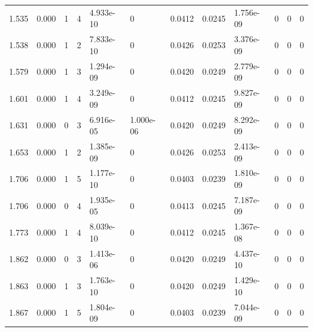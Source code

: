 \documentclass[preview]{standalone}
\begin{document}
{{\begin{tabular}{L{1.2cm}C{1.2cm} C{0.3cm}C{0.5cm} C{1.4cm}C{1.4cm} C{1.4cm}C{1.4cm} C{1.6cm}C{1.6cm} C{1.6cm}C{1.6cm}}
  1.535  &  0.000  & 1     &  4 &  4.933e-10  & 0  &  0.0412&   0.0245& 1.756e-09 & 0   &  0 & 0  \\ 
  1.538  &  0.000  & 1     &  2 &  7.833e-10  & 0  &  0.0426&   0.0253& 3.376e-09 & 0   &  0 & 0  \\ 
  1.579  &  0.000  & 1     &  3 &  1.294e-09  & 0  &  0.0420&   0.0249& 2.779e-09 & 0   &  0 & 0  \\ 
  1.601  &  0.000  & 1     &  4 &  3.249e-09  & 0  &  0.0412&   0.0245& 9.827e-09 & 0   &  0 & 0  \\ 
  1.631  &  0.000  & 0     &  3 &  6.916e-05  & 1.000e-06  &  0.0420&   0.0249& 8.292e-09 & 0   &  0 & 0  \\ 
  1.653  &  0.000  & 1     &  2 &  1.385e-09  & 0  &  0.0426&   0.0253& 2.413e-09 & 0   &  0 & 0  \\ 
  1.706  &  0.000  & 1     &  5 &  1.177e-10  & 0  &  0.0403&   0.0239& 1.810e-09 & 0   &  0 & 0  \\ 
  1.706  &  0.000  & 0     &  4 &  1.935e-05  & 0  &  0.0413&   0.0245& 7.187e-09 & 0   &  0 & 0  \\ 
  1.773  &  0.000  & 1     &  4 &  8.039e-10  & 0  &  0.0412&   0.0245& 1.367e-08 & 0   &  0 & 0  \\ 
  1.862  &  0.000  & 0     &  3 &  1.413e-06  & 0  &  0.0420&   0.0249& 4.437e-10 & 0   &  0 & 0  \\ 
  1.863  &  0.000  & 1     &  3 &  1.763e-10  & 0  &  0.0420&   0.0249& 1.429e-10 & 0   &  0 & 0  \\ 
  1.867  &  0.000  & 1     &  5 &  1.804e-09  & 0  &  0.0403&   0.0239& 7.044e-09 & 0   &  0 & 0  \\ 
\hline 
\end{tabular} 

}}
\end{document}
